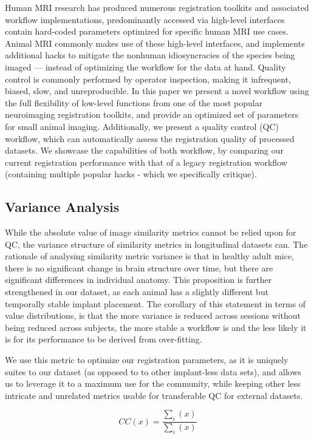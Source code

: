 Human MRI research has produced numerous registration toolkits and associated workflow implementations, predominantly accessed via high-level interfaces contain hard-coded parameters optimized for specific human MRI use cases.
Animal MRI commonly makes use of these high-level interfaces, and implements additional hacks to mitigate the nonhuman idiosyncracies of the species being imaged --- instead of optimizing the workflow for the data at hand.
Quality control is commonly performed by operator inspection, making it infrequent, biased, slow, and unreproducible.
In this paper we present a novel workflow using the full flexibility of low-level functions from one of the most popular neuroimaging registration toolkits, and provide an optimized set of parameters for small animal imaging.
Additionally, we present a quality control (QC) workflow, which can automatically assess the registration quality of processed datasets.
We showcase the capabilities of both workflow, by comparing our current registration performance with that of a legacy registration workflow (containing multiple popular hacks - which we specifically critique).

\subsection{Variance Analysis}

While the absolute value of image similarity metrics cannot be relied upon for QC, the variance structure of similarity metrics in longitudinal datasets can.
The rationale of analysing similarity metric variance is that in healthy adult mice, there is no significant change in brain structure over time, but there are significant differences in individual anatomy.
This proposition is further strengthened in our dataset, as each animal has a slightly different but temporally stable implant placement. 
The corollary of this statement in terms of value distributions, is that the more variance is reduced across sessions without being reduced across subjects, the more stable a workflow is and the less likely it is for its performance to be derived from over-fitting.


We use this metric to optimize our registration parameters, as it is uniquely suites to our dataset (as opposed to to other implant-less data sets), and allows us to leverage it to a maximum use for the community, while keeping other less intricate and unrelated metrics usable for transferable QC for external datasets.


\[ CC(x) = \frac{\sum_i{(x)}}{\sum_i{(x)}} \]

